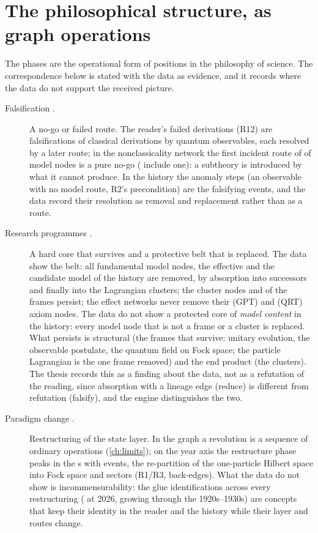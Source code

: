\section{The philosophical structure, as graph operations}\label{sec:philosophy}
The phases are the operational form of positions in the philosophy of science. The correspondence below is stated with the data as evidence, and it records where the data do not support the received picture.
\begin{description}
\item[Falsification \citep{popper1959}.] A no-go or failed route. The reader's \EemFailedTotal{} failed derivations (R12) are falsifications of classical derivations by quantum observables, each resolved by a later route; in the nonclassicality network the first incident route of \EgptMnoGoFirst{} of \EgptMtotal{} model nodes is a pure no-go (\EgptMnoGoAny{} include one): a subtheory is introduced by what it cannot produce. In the history the anomaly steps (an observable with no model route, R2's precondition) are the falsifying events, and the data record their resolution as removal and replacement rather than as a route.
\item[Research programmes \citep{lakatos1970}.] A hard core that survives and a protective belt that is replaced. The data show the belt: all \EhepMfundAll{} fundamental model nodes, the \EhepMeffAll{} effective and the \EhepMcandAll{} candidate model of the history are removed, by absorption into successors and finally into the Lagrangian clusters; the \EhepMclusterAll{} cluster nodes and \EhepMframeKept{} of the \EhepMframeAll{} frames persist; the effect networks never remove their \EgptAxioms{} (GPT) and \EqrtAxioms{} (QRT) axiom nodes. The data do not show a protected core of \emph{model content} in the history: every model node that is not a frame or a cluster is replaced. What persists is structural (the frames that survive: unitary evolution, the observable postulate, the quantum field on Fock space; the particle Lagrangian is the one frame removed) and the end product (the clusters). The thesis records this as a finding about the data, not as a refutation of the reading, since absorption with a lineage edge (reduce) is different from refutation (falsify), and the engine distinguishes the two.
\item[Paradigm change \citep{kuhn1962}.] Restructuring of the state layer. In the graph a revolution is a sequence of ordinary operations (\cref{ch:limits}); on the year axis the restructure phase peaks in the \EdecadeMaxrestructure{}s with \EdecadeMaxrestructureN{} events, the re-partition of the one-particle Hilbert space into Fock space and sectors (R1/R3, back-edges). What the data do not show is incommensurability: the glue identifications across every restructuring (\EmergedGlue{} at 2026, growing through the 1920s--1930s) are concepts that keep their identity in the reader and the history while their layer and routes change.

\end{description}
